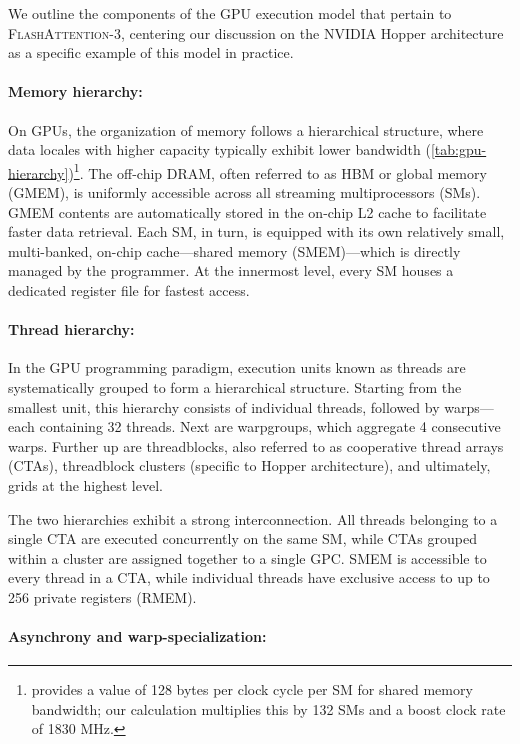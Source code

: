We outline the components of the GPU execution model that pertain to \textsc{FlashAttention-3}, centering our discussion on the NVIDIA Hopper architecture as a specific example of this model in practice.

\paragraph{Memory hierarchy:} On GPUs, the organization of memory follows a hierarchical structure, where data locales with higher capacity typically exhibit lower bandwidth (\cref{tab:gpu-hierarchy})\footnote{\citet{luo2024benchmarking} provides a value of 128 bytes per clock cycle per SM for shared memory bandwidth; our calculation multiplies this by 132 SMs and a boost clock rate of 1830 MHz.}. The off-chip DRAM, often referred to as HBM or global memory (GMEM), is uniformly accessible across all streaming multiprocessors (SMs). GMEM contents are automatically stored in the on-chip L2 cache to facilitate faster data retrieval. Each SM, in turn, is equipped with its own relatively small, multi-banked, on-chip cache—shared memory (SMEM)—which is directly managed by the programmer. At the innermost level, every SM houses a dedicated register file for fastest access.

\paragraph{Thread hierarchy:} In the GPU programming paradigm, execution units known as threads are systematically grouped to form a hierarchical structure. Starting from the smallest unit, this hierarchy consists of individual threads, followed by warps—each containing 32 threads. Next are warpgroups, which aggregate 4 consecutive warps. Further up are threadblocks, also referred to as cooperative thread arrays (CTAs), threadblock clusters (specific to Hopper architecture), and ultimately, grids at the highest level.

The two hierarchies exhibit a strong interconnection. All threads belonging to a single CTA are executed concurrently on the same SM, while CTAs grouped within a cluster are assigned together to a single GPC. SMEM is accessible to every thread in a CTA, while individual threads have exclusive access to up to 256 private registers (RMEM).

\paragraph{Asynchrony and warp-specialization:}

